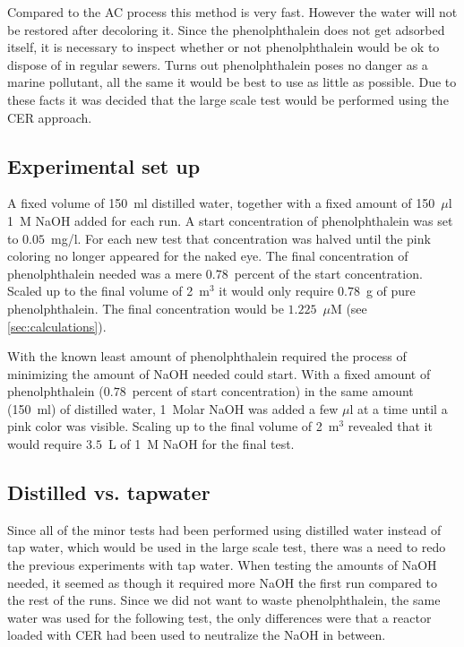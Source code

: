Compared to the AC process this method is very fast. However the water will not be restored after decoloring it. Since the phenolphthalein does not get adsorbed itself, it is necessary to inspect whether or not phenolphthalein would be ok to dispose of in regular sewers. Turns out phenolphthalein poses no danger as a marine pollutant\cite{url}, all the same it would be best to use as little as possible.
Due to these facts it was decided that the large scale test would be performed using the CER approach.

\subsection{Experimental set up}
A fixed volume of 150~ml distilled water, together with a fixed amount of 150~$\mu$l 1~M NaOH added for each run. A start concentration of phenolphthalein was set to $0.05$~mg/l. For each new test that concentration was halved until the pink coloring no longer appeared for the naked eye. The final concentration of phenolphthalein needed was a mere $0.78$~percent of the start concentration. Scaled up to the final volume of 2~m$^3$ it would only require $0.78$~g of pure phenolphthalein. The final concentration would be $1.225$~$\mu$M (see \cref{sec:calculations}).

With the known least amount of phenolphthalein required the process of minimizing the amount of NaOH needed could start. With a fixed amount of phenolphthalein ($0.78$~percent of start concentration) in the same amount (150~ml) of distilled water, 1~Molar NaOH was added a few $\mu$l at a time until a pink color was visible. Scaling up to the final volume of 2~m$^3$ revealed that it would require $3.5$~L of 1~M NaOH for the final test.

\subsection{Distilled vs. tapwater}
Since all of the minor tests had been performed using distilled water instead of tap water, which would be used in the large scale test, there was a need to redo the previous experiments with tap water. When testing the amounts of NaOH needed, it seemed as though it required more NaOH the first run compared to the rest of the runs. Since we did not want to waste phenolphthalein, the same water was used for the following test, the only differences were that a reactor loaded with CER had been used to neutralize the NaOH in between.


